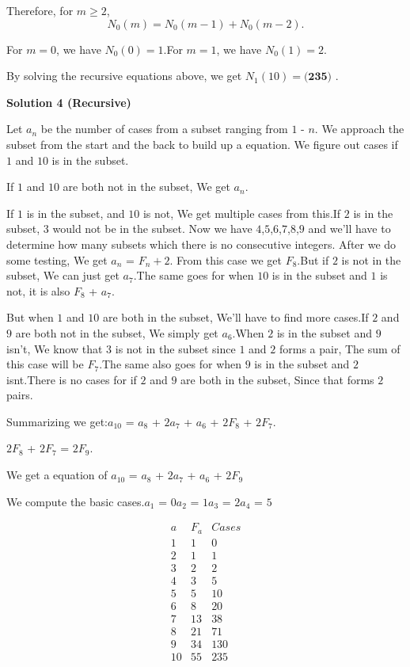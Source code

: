 \begin{enumerate}
{{ Therefore, for $m \geq 2$,
 \[N_0 \left( m \right) = N_0 \left( m - 1 \right) + N_0 \left( m - 2 \right)  .\]

 For $m = 0$, we have $N_0 \left( 0 \right) = 1$.For $m = 1$, we have $N_0 \left( 1 \right) = 2$.

 By solving the recursive equations above, we get $N_1 \left( 10 \right) = \boxed{\textbf{(235) }}$.

 



\textbf{Solution 4 (Recursive)}

Let $a_n$ be the number of cases from a subset ranging from $1$ - $n$.  We approach the subset from the start and the back to build up a equation. We figure out cases if $1$ and $10$ is in the subset.

 
If $1$ and $10$ are both not in the subset, We get $a_n$.

 
If $1$ is in the subset, and $10$ is not, We get multiple cases from this.If $2$ is in the subset, $3$ would not be in the subset. Now we have {$4$,$5$,$6$,$7$,$8$,$9$} and we'll have to determine how many subsets which there is no consecutive integers. After we do some testing, We get $a_n$ = $F_n+2$. From this case we get $F_8$.But if $2$ is not in the subset, We can just get $a_7$.The same goes for when $10$ is in the subset and $1$ is not, it is also $F_8$ + $a_7$.

 
But when $1$ and $10$ are both in the subset, We'll have to find more cases.If $2$ and $9$ are both not in the subset, We simply get $a_6$.When $2$ is in the subset and $9$ isn't, We know that $3$ is not in the subset since $1$ and $2$ forms a pair, The sum of this case will be $F_7$.The same also goes for when $9$ is in the subset and $2$ isnt.There is no cases for if $2$ and $9$ are both in the subset, Since that forms $2$ pairs.

 
Summarizing we get:$a_{10}$ = $a_8$ + $2$$a_7$ + $a_6$ + $2$$F_8$ + $2$$F_7$.

 
$2$$F_8$ + $2$$F_7$ = $2$$F_9$.

 
We get a equation of $a_{10}$ = $a_8$ + $2$$a_7$ + $a_6$ + $2$$F_9$

 We compute the basic cases.$a_1$ = $0$$a_2$ = $1$$a_3$ = $2$$a_4$ = $5$

 \[\begin{array}{rcl} a & F_a & Cases\\ \hline 1 & 1 & 0 \\ 2 & 1 & 1 \\ 3 & 2 & 2 \\ 4 & 3 & 5 \\ 5 & 5 & 10 \\ 6 & 8 & 20 \\ 7 & 13 & 38 \\ 8 & 21 & 71 \\ 9 & 34 & 130 \\ 10 & 55 & 235 \\ \end{array}\]

}}
\end{enumerate}
